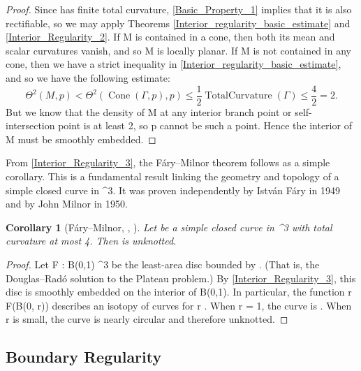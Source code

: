 \documentclass[a4paper, 11pt]{article}
\theoremstyle{plain}
\newtheorem{corollary}[theorem]{Corollary}
\theoremstyle{definition}
\theoremstyle{remark}
\numberwithin{equation}{subsection}
\def\({}
\def\){}
\def\pi{}
\begin{document}
\begin{proof}
Since \(\Gamma\) has finite total curvature, \cref{Basic_Property_1} implies that it is also rectifiable, so we may apply Theorems \ref{Interior_regularity_basic_estimate} and \ref{Interior_Regularity_2}. If \(M\) is contained in a cone, then both its mean and scalar curvatures vanish, and so \(M\) is locally planar. If \(M\) is not contained in any cone, then we have a strict inequality in \cref{Interior_regularity_basic_estimate}, and so we have the following estimate:
\begin{equation}
\Theta^{2}(M,p) < \Theta^{2}(\operatorname{Cone}(\Gamma,p),p) \leqslant \frac{1}{2\pi}\operatorname{TotalCurvature}(\Gamma) \leqslant \frac{4\pi}{2\pi} = 2.
\end{equation}
But we know that the density of \(M\) at any interior branch point or self-intersection point is at least \(2\), so \(p\) cannot be such a point. Hence the interior of \(M\) must be smoothly embedded.
\end{proof}


From \cref{Interior_Regularity_3}, the F{\'a}ry--Milnor theorem follows as a simple corollary.  This is a fundamental result linking the geometry and topology of a simple closed curve in \(^{3}\). It was proven independently by Istv{\'a}n F{\'a}ry in 1949 and by John Milnor in 1950.

\begin{corollary}[F{\'a}ry--Milnor, \cite{Far49}, \cite{Mil50}]
Let \(\Gamma\) be a simple closed curve in \(^{3}\) with total curvature at most \(4\pi\). Then \(\Gamma\) is unknotted.
\end{corollary}

\begin{proof}
Let \(F : B(0,1) \rightarrow {}^{3}\) be the least-area disc bounded by \(\Gamma\). (That is, the Douglas--Rad{\'o} solution to the Plateau problem.) By  \cref{Interior_Regularity_3}, this disc is smoothly embedded on the interior of \(B(0,1)\). In particular, the function \(r \mapsto F(\partial B(0, r))\) describes an isotopy of curves for \(r \). When \(r = 1\), the curve is \(\Gamma\). When \(r\) is small, the curve is nearly circular and therefore unknotted.
\end{proof}

\subsection{Boundary Regularity}
\end{document}
